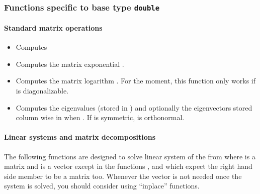 \subsubsection{Functions specific to base type {\tt double}}

\paragraph{Standard matrix operations}
\begin{itemize}

\item {}
  \sshortdescribe Computes 

  
\item {}
  \sshortdescribe Computes the matrix exponential .

\item {}
  \sshortdescribe Computes the matrix logarithm . For the
  moment, this function only works if  is diagonalizable.

\item {}
  \sshortdescribe Computes the eigenvalues (stored in ) and optionally
  the eigenvectors stored column wise in  when
  . If  is symmetric,  is orthonormal.
\end{itemize}

\paragraph{Linear systems and matrix decompositions}

The following functions are designed to solve linear system of the from  where  is a matrix and  is a vector except in the functions
,  and
 which expect the right hand side member to be a
matrix too. Whenever the vector  is not needed once the system is solved,
you should consider using ``inplace'' functions.

